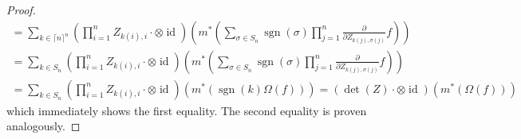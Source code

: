 \begin{proof}
\begin{equation}
\begin{aligned}
      = \sum_{k \in \lceil n \rceil^n} \left( \prod_{i=1}^n Z_{k(i),i} \cdot \otimes \operatorname{id} \right) \left( m^\ast \left( \sum_{\sigma \in S_n} \operatorname{sgn} \left( \sigma \right) \prod_{j=1}^n \frac{\partial}{\partial Z_{k(j),\sigma (j)}} f \right) \right) \\
      = \sum_{k \in S_n} \left( \prod_{i=1}^n Z_{k(i),i} \cdot \otimes \operatorname{id} \right) \left( m^\ast \left( \sum_{\sigma \in S_n} \operatorname{sgn} \left( \sigma \right) \prod_{j=1}^n \frac{\partial}{\partial Z_{k(j),\sigma (j)}} f \right) \right) \\
      = \sum_{k \in S_n} \left( \prod_{i=1}^n Z_{k(i),i} \cdot \otimes \operatorname{id} \right) \left( m^\ast \left( \operatorname{sgn} (k) \Omega (f) \right) \right)
      = \left( \operatorname{det} (Z) \cdot \otimes \operatorname{id} \right) \left( m^\ast \left( \Omega (f) \right) \right)
    \end{aligned}
  \end{equation}
  which immediately shows the first equality.
  The second equality is proven analogously.
\end{proof}

